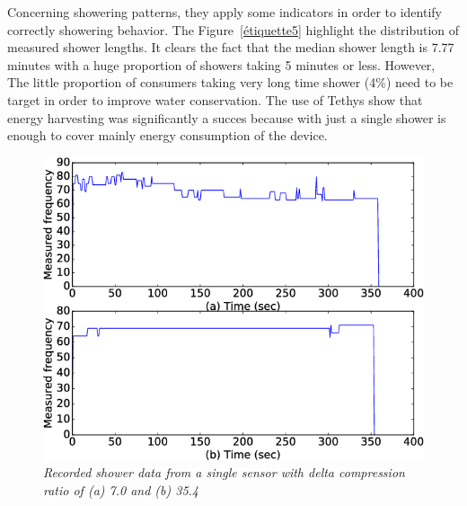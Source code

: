 \documentclass[10pt,journal,compsoc]{IEEEtran}
\begin{document}
Concerning showering patterns, they apply some indicators in order to identify correctly showering behavior. The Figure~\ref{étiquette5} highlight the distribution of measured shower lengths. It clears the fact that the median shower length is 7.77 minutes with a huge proportion of showers taking 5 minutes or less. However, The little proportion of consumers taking very long time shower (4\%) need to be target in order to improve water conservation. 
The use of Tethys show that energy harvesting was significantly a succes because with just a single shower is enough to cover mainly energy consumption of the device. 

\begin{center}
    \begin{figure}[!t]
        \includegraphics[scale=0.4]{record-shower-comparison.png}
        \caption{\label{étiquette4} \emph{Recorded shower data from a single sensor with delta compression ratio of (a) 7.0 and (b) 35.4} \cite{IEEEhowto:}}
    \end{figure}

\end{center}
\end{document}
